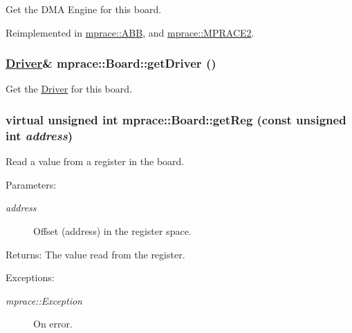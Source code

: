 Get the DMA Engine for this board. 



Reimplemented in \hyperlink{classmprace_1_1ABB_a10}{mprace::ABB}, and \hyperlink{classmprace_1_1MPRACE2_a8}{mprace::MPRACE2}.\hypertarget{classmprace_1_1Board_a11}{
\subsubsection[getDriver]{\setlength{\rightskip}{0pt plus 5cm}\hyperlink{classmprace_1_1Driver}{Driver}\& mprace::Board::get\-Driver ()}}
\label{classmprace_1_1Board_a11}


Get the \hyperlink{classmprace_1_1Driver}{Driver} for this board. 

\hypertarget{classmprace_1_1Board_a2}{
\subsubsection[getReg]{\setlength{\rightskip}{0pt plus 5cm}virtual unsigned int mprace::Board::get\-Reg (const unsigned int {\em address})}}
\label{classmprace_1_1Board_a2}


Read a value from a register in the board. 

\begin{Desc}
\item[Parameters:]
\begin{description}
\item[{\em address}]Offset (address) in the register space. \end{description}
\end{Desc}
\begin{Desc}
\item[Returns:]The value read from the register. \end{Desc}
\begin{Desc}
\item[Exceptions:]
\begin{description}
\item[{\em mprace::Exception}]On error.\end{description}
\end{Desc}



